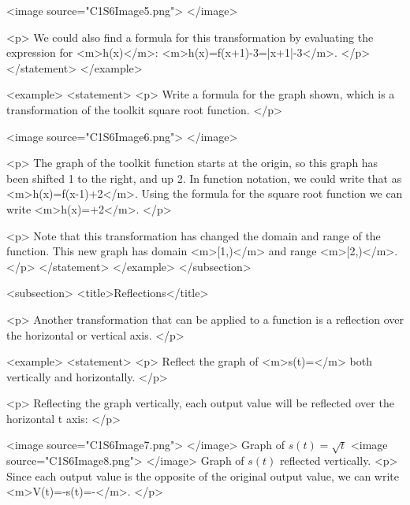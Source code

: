                 <image source="C1S6Image5.png">
                </image>

                <p>
                    We could also find a formula for this transformation by evaluating the expression for <m>h(x)</m>: <m>h(x)=f(x+1)-3=|x+1|-3</m>.
                </p>
            </statement>
        </example>

        <example>
            <statement>
                <p>
                    Write a formula for the graph shown, which is a transformation of the toolkit square root function.
                </p>

                <image source="C1S6Image6.png">
                </image>

                <p>
                    The graph of the toolkit function starts at the origin, so this graph has been shifted 1 to the right, and up 2.
                    In function notation, we could write that as <m>h(x)=f(x-1)+2</m>.
                    Using the formula for the square root function we can write <m>h(x)=+2</m>.
                </p>

                <p>
                    Note that this transformation has changed the domain and range of the function.
                    This new graph has domain <m>[1,\infty)</m> and range <m>[2,\infty)</m>.
                </p>
            </statement>
        </example>
    </subsection>


    <subsection>
        <title>Reflections</title>

        <p>
            Another transformation that can be applied to a function is a reflection over the horizontal or vertical axis.
        </p>

        <example>
            <statement>
                <p>
                    Reflect the graph of <m>s(t)=</m> both vertically and horizontally.
                </p>

                <p>
                    Reflecting the graph vertically, each output value will be reflected over the horizontal t axis:
                </p>

                <image source="C1S6Image7.png">
                </image>
                Graph of $s(t)=\sqrt{t}$
                <image source="C1S6Image8.png">
                </image>
                Graph of $s(t)$ reflected vertically.
                <p>
                    Since each output value is the opposite of the original output value, we can write <m>V(t)=-s(t)=-</m>.
                </p>

